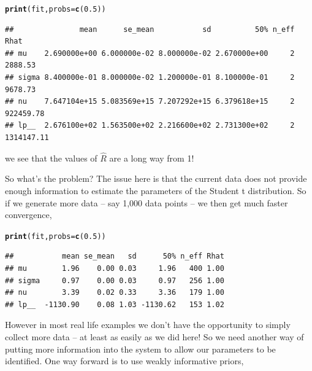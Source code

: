 \documentclass[11pt,fullpage]{book}
\makeatletter
\newenvironment{kframe}{%
	\def\at@end@of@kframe{}%
	\ifinner\ifhmode%
	\def\at@end@of@kframe{\end{minipage}}%
\begin{minipage}{\columnwidth}%
	\fi\fi%
	\def\FrameCommand##1{\hskip\@totalleftmargin \hskip-\fboxsep
		\colorbox{shadecolor}{##1}\hskip-\fboxsep
		\hskip-\linewidth \hskip-\@totalleftmargin \hskip\columnwidth}%
	\MakeFramed {\advance\hsize-\width
		\@totalleftmargin\z@ \linewidth\hsize
		\@setminipage}}%
{\par\unskip\endMakeFramed%
	\at@end@of@kframe}
\newcommand{\hlnum}[1]{\textcolor[rgb]{0.686,0.059,0.569}{#1}}%
\newcommand{\hlstd}[1]{\textcolor[rgb]{0.345,0.345,0.345}{#1}}%
\newcommand{\hlkwc}[1]{\textcolor[rgb]{0.333,0.667,0.333}{#1}}%
\newcommand{\hlkwd}[1]{\textcolor[rgb]{0.737,0.353,0.396}{\textbf{#1}}}%
\newenvironment{knitrout}{}{} %
\makeatother
\begin{document}
\begin{knitrout}\footnotesize
		\color{fgcolor}\begin{kframe}
\begin{alltt}
\hlkwd{print}\hlstd{(fit,}\hlkwc{probs} \hlstd{=} \hlkwd{c}\hlstd{(}\hlnum{0.5}\hlstd{))}
\end{alltt}
\begin{verbatim}
##               mean      se_mean           sd          50% n_eff       Rhat
## mu    2.690000e+00 6.000000e-02 8.000000e-02 2.670000e+00     2    2888.53
## sigma 8.400000e-01 8.000000e-02 1.200000e-01 8.100000e-01     2    9678.73
## nu    7.647104e+15 5.083569e+15 7.207292e+15 6.379618e+15     2  922459.78
## lp__  2.676100e+02 1.563500e+02 2.216600e+02 2.731300e+02     2 1314147.11
\end{verbatim}
		\end{kframe}
	\end{knitrout}

we see that the values of $\hat{R}$ are a long way from 1! 

So what's the problem? The issue here is that the current data does not provide enough information to estimate the parameters of the Student t distribution. So if we generate more data -- say 1,000 data points -- we then get much faster convergence,

\begin{knitrout}\footnotesize
		\color{fgcolor}\begin{kframe}
\begin{alltt}
\hlkwd{print}\hlstd{(fit,}\hlkwc{probs} \hlstd{=} \hlkwd{c}\hlstd{(}\hlnum{0.5}\hlstd{))}
\end{alltt}
\begin{verbatim}
##           mean se_mean   sd      50% n_eff Rhat
## mu        1.96    0.00 0.03     1.96   400 1.00
## sigma     0.97    0.00 0.03     0.97   256 1.00
## nu        3.39    0.02 0.33     3.36   179 1.00
## lp__  -1130.90    0.08 1.03 -1130.62   153 1.02
\end{verbatim}
		\end{kframe}
	\end{knitrout}

However in most real life examples we don't have the opportunity to simply collect more data -- at least as easily as we did here! So we need another way of putting more information into the system to allow our parameters to be identified. One way forward is to use weakly informative priors,
\end{document}
